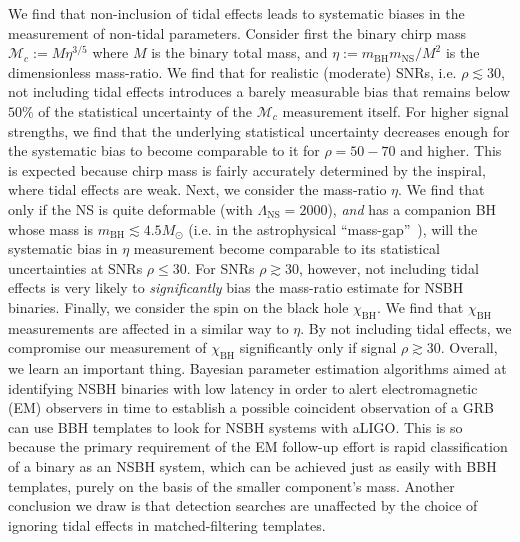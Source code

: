 \documentclass[aps,prd,amsmath,floats,floatfix, twocolumn,
superscriptaddress,nofootinbib,showpacs]{revtex4-1}
\newcommand{\prayush}{\textcolor{red!40!black}}
\newcommand{\lambdans}{\Lambda_\mathrm{NS}}
\newcommand{\chibh}{\chi_\mathrm{BH}}
\newcommand{\mbh}{m_\mathrm{BH}}
\newcommand{\mns}{m_\mathrm{NS}}
\newcommand{\mchirp}{\mathcal{M}_c}
\begin{document}
\prayush{
We find that non-inclusion of tidal effects leads to systematic biases in
the measurement of non-tidal parameters. Consider first the binary chirp 
mass $\mchirp:=M\eta^{3/5}$ where $M$ is the binary total mass, and 
$\eta:=\mbh\mns/M^2$ is the dimensionless mass-ratio. We find that for
realistic (moderate) SNRs, i.e. $\rho\lesssim 30$, not including tidal
effects introduces a barely measurable bias that remains below $50\%$
of the statistical uncertainty of the $\mchirp$ measurement itself.
For higher signal strengths, we find that the underlying statistical
uncertainty decreases enough for the systematic bias to become comparable
to it for $\rho=50-70$ and higher. This is expected because chirp mass is fairly
accurately determined by the inspiral, where tidal effects are weak.
Next, we consider the mass-ratio $\eta$. We find that only if the NS is quite
deformable (with $\lambdans=2000$), {\it and} has a companion BH whose mass
is $\mbh\lesssim 4.5M_\odot$ (i.e. in the astrophysical ``mass-gap''~\cite{
Bailyn:1997xt,Kalogera:1996ci,Kreidberg:2012,Littenberg:2015tpa}),
will the systematic bias in $\eta$ measurement become comparable to its
statistical uncertainties at SNRs $\rho\leq 30$. For SNRs $\rho\gtrsim30$,
however, not including tidal effects is very likely to {\it significantly} bias
the mass-ratio estimate for NSBH binaries. Finally, we consider the spin on the
black hole $\chibh$. We find that $\chibh$ measurements are affected in a similar
way to $\eta$. By not including tidal effects, we compromise our measurement of
$\chibh$ significantly only if signal $\rho\gtrsim 30$. 
%
Overall, we learn an important thing. Bayesian parameter estimation algorithms
aimed at identifying NSBH binaries with low latency in order to alert 
electromagnetic (EM) observers in time to establish a possible coincident 
observation of a GRB~\cite{2012A&A...541A.155A,Singer:2014qca,Singer:2015ema,
Pankow:2015cra} can use BBH templates to look for NSBH systems with aLIGO.
This is so because the primary requirement of the EM follow-up effort is rapid
classification of a binary as an NSBH system, which can be achieved just as 
easily with BBH templates, purely on the basis of the smaller component's mass.
Another conclusion we draw is that detection searches are unaffected by the
choice of ignoring tidal effects in matched-filtering templates.
}
\end{document}
